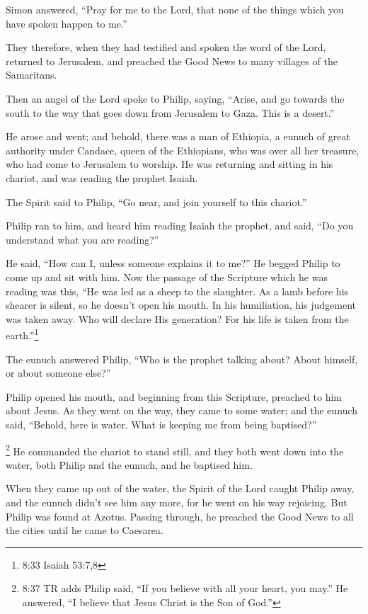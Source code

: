  Simon answered, ``Pray for me to the Lord, that none of
the things which you have spoken happen to me.''

 They therefore, when they had testified and spoken the
word of the Lord, returned to Jerusalem, and preached the Good News to
many villages of the Samaritans.

 Then an angel of the Lord spoke to Philip, saying,
``Arise, and go towards the south to the way that goes down from
Jerusalem to Gaza. This is a desert.''

 He arose and went; and behold, there was a man of
Ethiopia, a eunuch of great authority under Candace, queen of the
Ethiopians, who was over all her treasure, who had come to Jerusalem to
worship.  He was returning and sitting in his chariot, and
was reading the prophet Isaiah.

 The Spirit said to Philip, ``Go near, and join yourself to
this chariot.''

 Philip ran to him, and heard him reading Isaiah the
prophet, and said, ``Do you understand what you are reading?''

 He said, ``How can I, unless someone explains it to me?''
He begged Philip to come up and sit with him.  Now the
passage of the Scripture which he was reading was this, ``He was led as
a sheep to the slaughter. As a lamb before his shearer is silent, so he
doesn't open his mouth.  In his humiliation, his judgement
was taken away. Who will declare His generation? For his life is taken
from the earth.''\footnote{8:33 Isaiah 53:7,8}

 The eunuch answered Philip, ``Who is the prophet talking
about? About himself, or about someone else?''

 Philip opened his mouth, and beginning from this
Scripture, preached to him about Jesus.  As they went on
the way, they came to some water; and the eunuch said, ``Behold, here is
water. What is keeping me from being baptised?''

 \footnote{8:37 TR adds Philip said, ``If you believe with
  all your heart, you may.'' He answered, ``I believe that Jesus Christ
  is the Son of God.''}  He commanded the chariot to stand
still, and they both went down into the water, both Philip and the
eunuch, and he baptised him.

 When they came up out of the water, the Spirit of the Lord
caught Philip away, and the eunuch didn't see him any more, for he went
on his way rejoicing.  But Philip was found at Azotus.
Passing through, he preached the Good News to all the cities until he
came to Caesarea.

